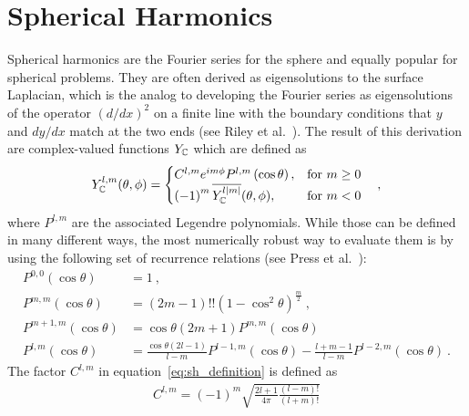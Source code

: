 \section{Spherical Harmonics}
\label{sec:sh}

Spherical harmonics are the Fourier series for the sphere and equally popular for spherical problems. They are often derived as eigensolutions to the surface Laplacian, which is the analog to developing the Fourier series as eigensolutions of the operator $(d/dx)^2$ on a finite line with the boundary conditions that $y$ and $dy/dx$ match at the two ends (see Riley et al.~\cite{Riley2006}). The result of this derivation are complex-valued functions $Y_{\mathbb{C}}$ which are defined as
\begin{align}
\label{eq:sh_definition}
Y_{\mathbb{C}}^{l,m}(\theta, \phi)=
\begin{cases}
C^{l,m}e^{im\phi}P^{l,m}\left(\operatorname{cos}\theta\right), & \text{for $m\ge0$}\\
\left(-1\right)^m\overline{Y_{\mathbb{C}}^{l\left|m\right|}}(\theta, \phi), & \text{for $m<0$}
\end{cases}
\quad ,
\end{align}
where $P^{l,m}$ are the associated Legendre polynomials. While those can be defined in many different ways, the most numerically robust way to evaluate them is by using the following set of recurrence relations (see Press et al.~\cite{Press07}):
\begin{align}
P^{0,0}\left(\operatorname{cos}\theta\right) &=
1
\  ,
\nonumber
\\
P^{m,m}\left(\operatorname{cos}\theta\right) &=
\left(2m-1\right)!!\left(1-\operatorname{cos}^2\theta\right)^\frac{m}{2}
\  ,
\nonumber
\\
P^{m+1,m}\left(\operatorname{cos}\theta\right) &=
\operatorname{cos}\theta\left(2m+1\right)P^{m,m}\left(\operatorname{cos}\theta\right)
\ 
\nonumber
\\
P^{l,m}\left(\operatorname{cos}\theta\right) &=
\frac{\operatorname{cos}\theta\left(2l-1\right)}{l-m}
P^{l-1,m}\left(\operatorname{cos}\theta\right)
-
\frac{l+m-1}{l-m}
P^{l-2,m}\left(\operatorname{cos}\theta\right)
\  .
\label{eq:sh_Plm}
\end{align}
The factor $C^{l,m}$ in equation~\ref{eq:sh_definition} is defined as
\begin{align}
\label{eq:sh_definition_C}
C^{l,m}=(-1)^m\sqrt{\frac{2l+1}{4\pi}\frac{(l-m)!}{(l+m)!}}
\end{align}
